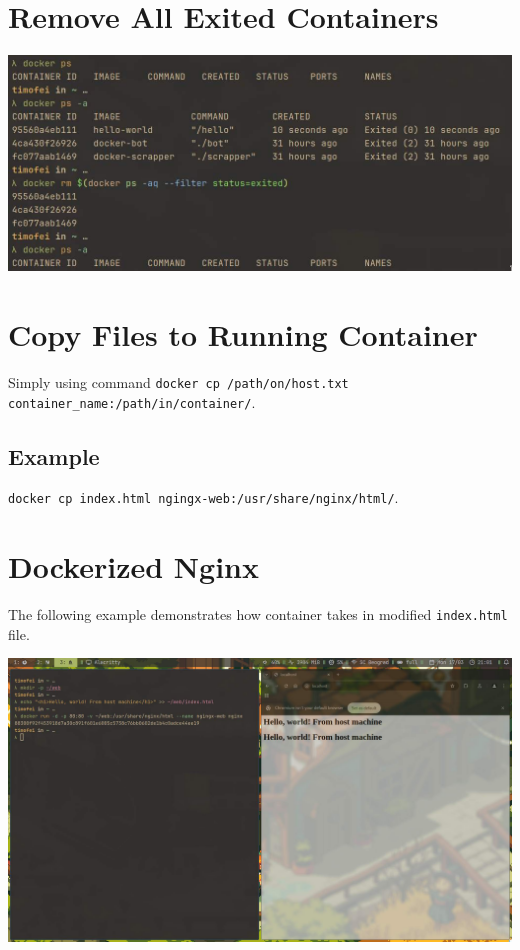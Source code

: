 \documentclass{article}
\newcommand{\code}[1]{\colorbox{light-gray}{\texttt{#1}}}
\begin{document}
\section{Remove All Exited Containers}
\noindent

\includegraphics[width=480pt]{remove_exited_containers.jpg}

\section{Copy Files to Running Container}
\noindent

Simply using command \code{docker cp /path/on/host.txt container\_name:/path/in/container/}.

\subsection{Example}
\noindent

\code{docker cp index.html ngingx-web:/usr/share/nginx/html/}. 

\newpage
\section{Dockerized Nginx}
\noindent

The following example demonstrates how container takes in modified \code{index.html} file.

\includegraphics[width=480pt]{nginx_before.jpg}
\end{document}

